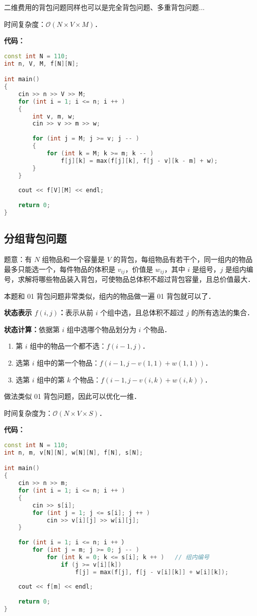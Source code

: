 二维费用的背包问题同样也可以是完全背包问题、多重背包问题...

时间复杂度：$\mathcal{O}(N \times V \times M)$．

\textbf{代码：}

\begin{lstlisting}[language=cpp]
const int N = 110;
int n, V, M, f[N][N];

int main()
{
    cin >> n >> V >> M;
    for (int i = 1; i <= n; i ++ )
    {
        int v, m, w;
        cin >> v >> m >> w;
        
        for (int j = M; j >= v; j -- )
        {
            for (int k = M; k >= m; k -- )
                f[j][k] = max(f[j][k], f[j - v][k - m] + w);
        }
    }
    
    cout << f[V][M] << endl;
    
    return 0;
}
\end{lstlisting}

\subsection{分组背包问题}

题意：有 $N$ 组物品和一个容量是 $V$ 的背包，每组物品有若干个，同一组内的物品最多只能选一个，每件物品的体积是 $v_{ij}$，价值是 $w_{ij}$，其中 $i$ 是组号，$j$ 是组内编号，求解将哪些物品装入背包，可使物品总体积不超过背包容量，且总价值最大．

本题和 01 背包问题非常类似，组内的物品做一遍 01 背包就可以了．

\textbf{状态表示 $f(i, j)$：}表示从前 $i$ 个组中选，且总体积不超过 $j$ 的所有选法的集合．

\textbf{状态计算：}依据第 $i$ 组中选哪个物品划分为 $i$ 个物品．

\begin{enumerate}
\item 第 $i$ 组中的物品一个都不选：$f(i - 1, j)$．
\item 选第 $i$ 组中的第一个物品：$f(i - 1, j - v(1, 1) + w(1, 1))$．
\item 选第 $i$ 组中的第 $k$ 个物品：$f(i - 1, j - v(i, k) + w(i, k))$．
\end{enumerate}

做法类似 01 背包问题，因此可以优化一维．

时间复杂度为：$\mathcal{O}(N \times V \times S)$．

\textbf{代码：}

\begin{lstlisting}[language=cpp]
const int N = 110;
int n, m, v[N][N], w[N][N], f[N], s[N];

int main()
{
    cin >> n >> m;
    for (int i = 1; i <= n; i ++ )
    {
        cin >> s[i];
        for (int j = 1; j <= s[i]; j ++ )
            cin >> v[i][j] >> w[i][j];
    }
    
    for (int i = 1; i <= n; i ++ ）
        for (int j = m; j >= 0; j -- )
            for (int k = 0; k <= s[i]; k ++ )   // 组内编号
                if (j >= v[i][k])
                    f[j] = max(f[j], f[j - v[i][k]] + w[i][k]);
    
    cout << f[m] << endl;
    
    return 0;
}
\end{lstlisting}

